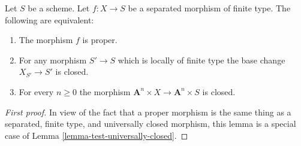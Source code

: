 \begin{lemma}
\label{lemma-limited-base-change}
Let $S$ be a scheme.
Let $f : X \to S$ be a separated morphism of finite type.
The following are equivalent:
\begin{enumerate}
\item The morphism $f$ is proper.
\item For any morphism $S' \to S$ which is locally of finite type
the base change $X_{S'} \to S'$ is closed.
\item For every $n \geq 0$ the morphism
$\mathbf{A}^n \times X \to \mathbf{A}^n \times S$ is closed.
\end{enumerate}
\end{lemma}

\begin{proof}[First proof]
In view of the fact that a proper morphism is the same thing as
a separated, finite type, and universally closed morphism, this
lemma is a special case of Lemma \ref{lemma-test-universally-closed}.
\end{proof}

